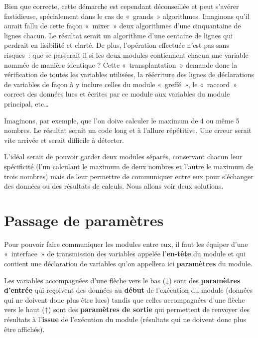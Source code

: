 
	Bien que correcte, cette démarche est cependant déconseillée et peut
	s’avérer fastidieuse, spécialement dans le cas de «~grands~»
	algorithmes. Imaginons qu’il aurait fallu de cette façon «~mixer~» deux
	algorithmes d’une cinquantaine de lignes chacun. Le résultat serait un
	algorithme d’une centaine de lignes qui perdrait en lisibilité et
	clarté. De plus, l’opération effectuée n’est pas sans risques~: que se
	passerait-il si les deux modules contiennent chacun une variable nommée
	de manière identique ? Cette «~transplantation~» demande donc la
	vérification de toutes les variables utilisées, la réécriture des
	lignes de déclarations de variables de façon à y inclure celles du
	module «~greffé~», le «~raccord~» correct des données lues et écrites
	par ce module aux variables du module principal, etc… 
	
	Imaginons, par exemple, que l'on doive calculer le
	maximum de 4 ou même 5 nombres. Le résultat serait un code long et
	à l'allure répétitive. Une erreur serait vite arrivée et
	serait difficile à détecter.
	
	L’idéal serait de pouvoir garder deux modules séparés, conservant chacun
	leur spécificité (l’un calculant le maximum de deux nombres et l’autre
	le maximum de trois nombres) mais de leur permettre de communiquer
	entre eux pour s’échanger des données ou des résultats de calculs. Nous
	allons voir deux solutions.

\section{Passage de paramètres}

	Pour pouvoir faire communiquer les modules entre eux, il faut les
	équiper d’une «~interface~» de transmission des variables appelée
	l’\textbf{en-tête }du module et qui contient une déclaration de
	variables qu’on appellera ici \textbf{paramètres} du module. 
	
	Les variables accompagnées d’une flèche vers le bas (\textsf{↓}) sont
	des \textbf{paramètres d’entrée} qui reçoivent des données au
	\textbf{début} de l’exécution du module (données qui ne doivent donc
	plus être lues) tandis que celles accompagnées d’une flèche vers le
	haut (\textsf{↑}) sont des \textbf{paramètres de sortie} qui permettent
	de renvoyer des résultats à l’\textbf{issue} de l’exécution du module
	(résultats qui ne doivent donc plus être affichés). 

